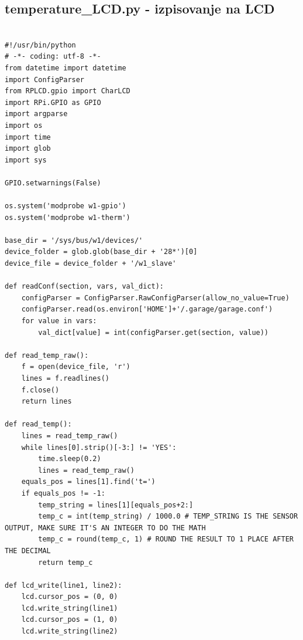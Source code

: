 \documentclass[11pt]{article}
\begin{document}
\subsection{temperature\_LCD.py - izpisovanje na LCD}
\begin{verbatim}

#!/usr/bin/python
# -*- coding: utf-8 -*-
from datetime import datetime
import ConfigParser
from RPLCD.gpio import CharLCD
import RPi.GPIO as GPIO
import argparse
import os
import time
import glob
import sys

GPIO.setwarnings(False)

os.system('modprobe w1-gpio')
os.system('modprobe w1-therm')

base_dir = '/sys/bus/w1/devices/'
device_folder = glob.glob(base_dir + '28*')[0]
device_file = device_folder + '/w1_slave'

def readConf(section, vars, val_dict):
    configParser = ConfigParser.RawConfigParser(allow_no_value=True)
    configParser.read(os.environ['HOME']+'/.garage/garage.conf')
    for value in vars:
        val_dict[value] = int(configParser.get(section, value))

def read_temp_raw():
    f = open(device_file, 'r')
    lines = f.readlines()
    f.close()
    return lines

def read_temp():
    lines = read_temp_raw()
    while lines[0].strip()[-3:] != 'YES':
        time.sleep(0.2)
        lines = read_temp_raw()
    equals_pos = lines[1].find('t=')
    if equals_pos != -1:
        temp_string = lines[1][equals_pos+2:]
        temp_c = int(temp_string) / 1000.0 # TEMP_STRING IS THE SENSOR OUTPUT, MAKE SURE IT'S AN INTEGER TO DO THE MATH
        temp_c = round(temp_c, 1) # ROUND THE RESULT TO 1 PLACE AFTER THE DECIMAL
        return temp_c

def lcd_write(line1, line2):
    lcd.cursor_pos = (0, 0)
    lcd.write_string(line1)
    lcd.cursor_pos = (1, 0)
    lcd.write_string(line2)


\end{verbatim}
\end{document}
